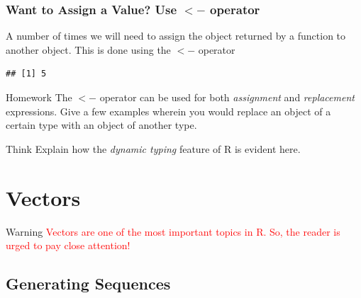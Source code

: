 \documentclass[12pt]{book}\usepackage{knitr}
\begin{document}
\subsubsection{Want to Assign a Value? Use $<-$ operator}
\noindent A number of times we will need to assign the object returned by a function to another object. This is done using the $<-$ operator 
\begin{knitrout}
\color{fgcolor}\begin{kframe}
\begin{alltt}
 \hlkwb{<-}  \hlopt{+} 
\end{alltt}
\begin{verbatim}
## [1] 5
\end{verbatim}
\end{kframe}
\end{knitrout}

\begin{DIY}{Homework}
The $<-$ operator can be used for both \emph{assignment} and \emph{replacement} expressions. Give a few examples wherein you would replace an object of a certain type with an object of another type.
\end{DIY}

\begin{DIY}{Think}
Explain how the \emph{dynamic typing} feature of R is evident here. 
\end{DIY}


\newpage
\section{Vectors}
\begin{HIGHLIGHT}
\par{}
\end{HIGHLIGHT}

\begin{DIY}{Warning}
\textcolor{red}{Vectors are one of the most important topics in R. So, the reader is urged to pay close attention!}
\end{DIY}

\subsection{Generating Sequences}
\end{document}
